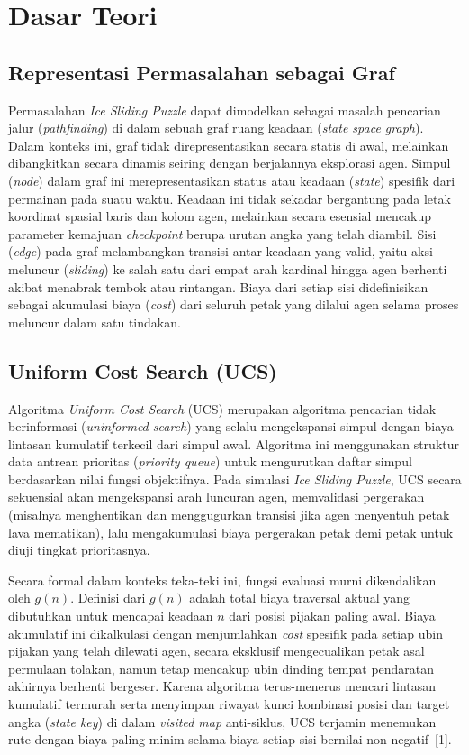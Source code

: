 \documentclass[12pt,a4paper]{article}
\begin{document}
\section{Dasar Teori}

\subsection{Representasi Permasalahan sebagai Graf}
Permasalahan \textit{Ice Sliding Puzzle} dapat dimodelkan sebagai masalah pencarian jalur (\textit{pathfinding}) di dalam sebuah graf ruang keadaan (\textit{state space graph}). Dalam konteks ini, graf tidak direpresentasikan secara statis di awal, melainkan dibangkitkan secara dinamis seiring dengan berjalannya eksplorasi agen. Simpul (\textit{node}) dalam graf ini merepresentasikan status atau keadaan (\textit{state}) spesifik dari permainan pada suatu waktu. Keadaan ini tidak sekadar bergantung pada letak koordinat spasial baris dan kolom agen, melainkan secara esensial mencakup parameter kemajuan \textit{checkpoint} berupa urutan angka yang telah diambil. Sisi (\textit{edge}) pada graf melambangkan transisi antar keadaan yang valid, yaitu aksi meluncur (\textit{sliding}) ke salah satu dari empat arah kardinal hingga agen berhenti akibat menabrak tembok atau rintangan. Biaya dari setiap sisi didefinisikan sebagai akumulasi biaya (\textit{cost}) dari seluruh petak yang dilalui agen selama proses meluncur dalam satu tindakan.

\subsection{Uniform Cost Search (UCS)}
Algoritma \textit{Uniform Cost Search} (UCS) merupakan algoritma pencarian tidak berinformasi (\textit{uninformed search}) yang selalu mengekspansi simpul dengan biaya lintasan kumulatif terkecil dari simpul awal. Algoritma ini menggunakan struktur data antrean prioritas (\textit{priority queue}) untuk mengurutkan daftar simpul berdasarkan nilai fungsi objektifnya. Pada simulasi \textit{Ice Sliding Puzzle}, UCS secara sekuensial akan mengekspansi arah luncuran agen, memvalidasi pergerakan (misalnya menghentikan dan menggugurkan transisi jika agen menyentuh petak lava mematikan), lalu mengakumulasi biaya pergerakan petak demi petak untuk diuji tingkat prioritasnya. 

Secara formal dalam konteks teka-teki ini, fungsi evaluasi murni dikendalikan oleh $g(n)$. Definisi dari $g(n)$ adalah total biaya traversal aktual yang dibutuhkan untuk mencapai keadaan $n$ dari posisi pijakan paling awal. Biaya akumulatif ini dikalkulasi dengan menjumlahkan \textit{cost} spesifik pada setiap ubin pijakan yang telah dilewati agen, secara eksklusif mengecualikan petak asal permulaan tolakan, namun tetap mencakup ubin dinding tempat pendaratan akhirnya berhenti bergeser. Karena algoritma terus-menerus mencari lintasan kumulatif termurah serta menyimpan
riwayat kunci kombinasi posisi dan target angka (\textit{state key}) di dalam \textit{visited map} anti-siklus, UCS terjamin menemukan rute dengan biaya paling minim selama biaya setiap sisi bernilai non negatif~[1].
\end{document}
